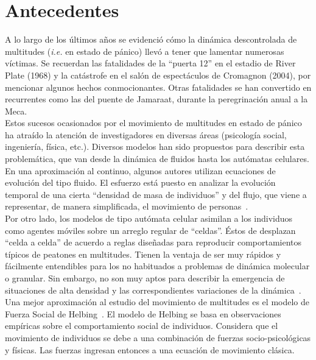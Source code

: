 \section{Antecedentes}

A lo largo de los últimos años se evidenció cómo la dinámica descontrolada de multitudes (\emph{i.e.} en estado de pánico) llevó a tener que lamentar numerosas víctimas. Se recuerdan las fatalidades  de  la “puerta 12” en el estadio de River Plate (1968) y la catástrofe en el salón de espectáculos de Cromagnon (2004), por mencionar algunos hechos conmocionantes. Otras fatalidades se han convertido en recurrentes como las del puente de Jamaraat, durante la peregrinación anual a la  Meca. \\   

\noindent Estos sucesos ocasionados por el movimiento de multitudes en estado de pánico ha atraído la atención de investigadores en diversas áreas (psicología social, ingeniería, física, etc.). Diversos modelos han sido propuestos para describir esta problemática, que van desde la dinámica de fluidos hasta los autómatas celulares.\\

\noindent En una aproximación al continuo, algunos autores utilizan ecuaciones de evolución del tipo fluido.  El esfuerzo está puesto en analizar la evolución temporal de una cierta “densidad de masa de individuos” y del  flujo, que viene a representar, de manera simplificada, el movimiento de personas~\cite{bruno}. \\

\noindent Por otro lado, los modelos de tipo autómata celular asimilan a los individuos como agentes móviles sobre un arreglo regular de “celdas”. Éstos de desplazan “celda a celda” de acuerdo a reglas diseñadas para reproducir comportamientos típicos de peatones en multitudes. Tienen la ventaja de ser muy rápidos y fácilmente entendibles para los no habituados a problemas de dinámica molecular o granular. Sin embargo, no son muy aptos para describir la emergencia de situaciones de alta densidad y las correspondientes variaciones de la dinámica~\cite{blue}.\\

\noindent Una mejor aproximación al estudio del movimiento de multitudes es el modelo de Fuerza Social de Helbing~\cite{Helbing1}. El modelo de Helbing se basa en observaciones empíricas sobre el comportamiento social de individuos. Considera que el movimiento de individuos se debe a una combinación de fuerzas socio-psicológicas y físicas. Las fuerzas ingresan entonces a una ecuación de movimiento clásica. \\

